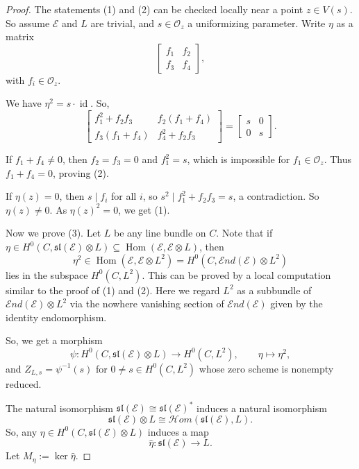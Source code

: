 \documentclass[11pt,letterpaper]{amsart}
\begin{document}
\begin{proof}
The statements (1) and (2) can be checked locally near a point $z\in V(s)$. So assume $\mathcal{E}$ and $L$ are trivial, and $s\in\mathcal{O}_{z}$ a uniformizing parameter. Write $\eta$ as a matrix
\[
\begin{bmatrix}
f_1 & f_2\\
f_3 & f_4
\end{bmatrix},
\]
with $f_i\in\mathcal{O}_z$.

We have $\eta^2=s\cdot\operatorname{id}$. So,
\[
\begin{bmatrix}
f_1^2+f_2f_3 & f_2(f_1+f_4)\\
f_3(f_1+f_4) & f_4^2+f_2f_3
\end{bmatrix}
=
\begin{bmatrix}
s & 0\\
0 & s
\end{bmatrix}.
\]

If $f_1+f_4\neq 0$, then $f_2=f_3=0$ and $f_1^2=s$, which is impossible for $f_1\in\mathcal{O}_z$. Thus $f_1+f_4=0$, proving (2).

If $\eta(z)=0$, then $s\mid f_i$ for all $i$, so $s^2\mid f_1^2+f_2f_3=s$, a contradiction. So $\eta(z)\neq 0$. As $\eta(z)^2=0$, we get (1).

Now we prove (3). Let $L$ be any line bundle on $C$. Note that if $\eta\in H^0(C,\mathfrak{sl}(\mathcal{E})\otimes L)\subseteq\operatorname{Hom}(\mathcal{E},\mathcal{E}\otimes L)$, then
\[
\eta^2\in\operatorname{Hom}(\mathcal{E},\mathcal{E}\otimes L^2)
=H^0(C,\mathcal{E}nd(\mathcal{E})\otimes L^2)
\]
lies in the subspace $H^0(C,L^2)$. This can be proved by a local computation similar to the proof of (1) and (2). Here we regard $L^2$ as a subbundle of $\mathcal{E}nd(\mathcal{E})\otimes L^2$ via the nowhere vanishing section of $\mathcal{E}nd(\mathcal{E})$ given by the identity endomorphism.

So, we get a morphism
\[
\psi:H^0(C,\mathfrak{sl}(\mathcal{E})\otimes L)\longrightarrow H^0(C,L^2),
\qquad
\eta\longmapsto \eta^2,
\]
and $Z_{L,s}=\psi^{-1}(s)$ for $0\neq s\in H^0(C,L^2)$ whose zero scheme is nonempty reduced.

The natural isomorphism $\mathfrak{sl}(\mathcal{E})\cong \mathfrak{sl}(\mathcal{E})^*$ induces a natural isomorphism
\[
\mathfrak{sl}(\mathcal{E})\otimes L\cong \mathcal{H}om(\mathfrak{sl}(\mathcal{E}),L).
\]
So, any $\eta\in H^0(C,\mathfrak{sl}(\mathcal{E})\otimes L)$ induces a map
\[
\widehat{\eta}:\mathfrak{sl}(\mathcal{E})\longrightarrow L.
\]Let $M_\eta:=\ker\widehat{\eta}$.


\end{proof}
\end{document}
